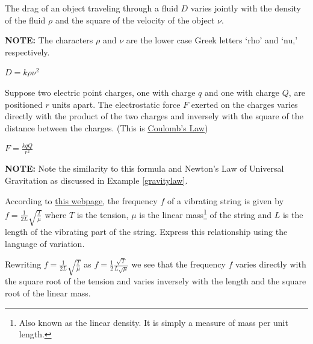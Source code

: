 \documentclass{ximera}
\begin{document}
\begin{question}
\begin{problem}
The drag of an object traveling through a fluid $D$ varies jointly with the density of the fluid $\rho$ and the square of the velocity of the object $\nu$.

\textbf{NOTE:}  The characters $\rho$ and $\nu$ are the lower case Greek letters `rho' and `nu,' respectively.

\begin{solution}
$D = k \rho \nu^2$
\end{solution}
\end{problem}

\begin{problem} \label{varexerciselast}
Suppose two electric point charges, one with charge $q$ and one with charge $Q$, are positioned $r$ units apart. The electrostatic force $F$ exerted on the charges varies directly with the product of the two charges and inversely with the square of the distance between the charges. (This is \href{http://en.wikipedia.org/wiki/Electrostatic#Coulomb.27s_law}{\underline{Coulomb's Law}})  

\begin{solution}
$F = \frac{kqQ}{r^2}$ 

\textbf{NOTE:}  Note the similarity to this formula and Newton's Law of Universal Gravitation as discussed in Example \ref{gravitylaw}.
\end{solution}


\end{problem}

\end{question}

 \begin{problem}
 According to \href{http://en.wikipedia.org/wiki/Vibrating_string}{\underline{this webpage}}, the frequency $f$ of a vibrating string is given by $f = \frac{1}{2L} \sqrt{\frac{T}{\mu}}$ where $T$ is the tension, $\mu$ is the linear mass\footnote{Also known as the linear density.  It is simply a measure of mass per unit length.} of the string and $L$ is the length of the vibrating part of the string.  Express this relationship using the language of variation.

 \begin{solution}
Rewriting $f = \frac{1}{2L} \sqrt{\frac{T}{\mu}}$ as $f =\frac{1}{2}  \frac{\sqrt{T}}{L \sqrt{\mu}}$ we see that the frequency $f$ varies directly with the square root of the tension and varies inversely with the length and the square root of the linear mass.
 \end{solution}
 \end{problem}
\end{document}
